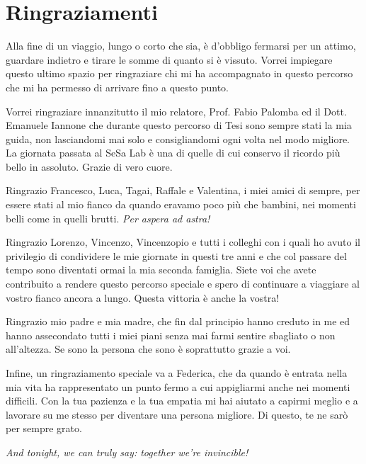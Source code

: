 \chapter{Ringraziamenti}

Alla fine di un viaggio, lungo o corto che sia, è d'obbligo fermarsi per un attimo, guardare indietro e tirare le somme di quanto si è vissuto. Vorrei impiegare questo ultimo spazio per ringraziare chi mi ha accompagnato in questo percorso che mi ha permesso di arrivare fino a questo punto. 

Vorrei ringraziare innanzitutto il mio relatore, Prof. Fabio Palomba ed il Dott. Emanuele Iannone che durante questo percorso di Tesi sono sempre stati la mia guida, non lasciandomi mai solo e consigliandomi ogni volta nel modo migliore. La giornata passata al SeSa Lab è una di quelle di cui conservo il ricordo più bello in assoluto. Grazie di vero cuore.

Ringrazio Francesco, Luca, Tagai, Raffale e Valentina, i miei amici di sempre, per essere stati al mio fianco da quando eravamo poco più che bambini, nei momenti belli come in quelli brutti. \textit{Per aspera ad astra!}

Ringrazio Lorenzo, Vincenzo, Vincenzopio e tutti i colleghi con i quali ho avuto il privilegio di condividere le mie giornate in questi tre anni e che col passare del tempo sono diventati ormai la mia seconda famiglia. Siete voi che avete contribuito a rendere questo percorso speciale e spero di continuare a viaggiare al vostro fianco ancora a lungo. Questa vittoria è anche la vostra!

Ringrazio mio padre e mia madre, che fin dal principio hanno creduto in me ed hanno assecondato tutti i miei piani senza mai farmi sentire sbagliato o non all'altezza. Se sono la persona che sono è soprattutto grazie a voi.

Infine, un ringraziamento speciale va a Federica, che da quando è entrata nella mia vita ha rappresentato un punto fermo a cui appigliarmi anche nei momenti difficili. Con la tua pazienza e la tua empatia mi hai aiutato a capirmi meglio e a lavorare su me stesso per diventare una persona migliore. Di questo, te ne sarò per sempre grato.
\begin{flushright}
    \textit{And tonight, we can truly say: together we're invincible!}
\end{flushright}
